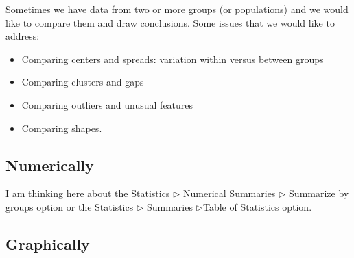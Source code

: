 \documentclass[captions=tableheading]{scrbook}
\begin{document}
\label{sec:Comparing-Data-Sets}

Sometimes we have data from two or more groups (or populations) and we would like to compare them and draw conclusions. Some issues that we would like to address:

\begin{itemize}
\item Comparing centers and spreads: variation within versus between groups
\item Comparing clusters and gaps
\item Comparing outliers and unusual features
\item Comparing shapes.
\end{itemize}
\subsection{Numerically}
\label{sec-3-6-1}


I am thinking here about the \textsf{Statistics} \textsf{\(\triangleright\)} \textsf{Numerical Summaries} \textsf{\(\triangleright\) Summarize by groups} option or the \textsf{Statistics} \textsf{\(\triangleright\)} \textsf{Summaries} \textsf{\(\triangleright\)Table of Statistics} option. 
\subsection{Graphically}
\label{sec-3-6-2}
\end{document}
